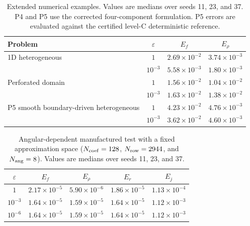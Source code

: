 \begin{table}[t]
\centering
\caption{Extended numerical examples. Values are medians over seeds 11, 23, and 37. P4 and P5 use the corrected four-component formulation. P5 errors are evaluated against the certified level-C deterministic reference.}
\label{tab:extended}
\begin{tabular}{lccc}
\toprule
Problem & $\varepsilon$ & $E_f$ & $E_\rho$\\
\midrule
1D heterogeneous & $1$ & $2.69\times10^{-2}$ & $3.74\times10^{-3}$\\
 & $10^{-3}$ & $5.58\times10^{-3}$ & $1.80\times10^{-3}$\\
\midrule
Perforated domain & $1$ & $1.56\times10^{-2}$ & $1.04\times10^{-2}$\\
 & $10^{-3}$ & $1.63\times10^{-2}$ & $1.38\times10^{-2}$\\
\midrule
P5 smooth boundary-driven heterogeneous & $1$ & $4.23\times10^{-2}$ & $4.76\times10^{-3}$\\
 & $10^{-3}$ & $3.62\times10^{-2}$ & $4.60\times10^{-3}$\\
\bottomrule
\end{tabular}
\end{table}

\begin{table}[t]
\centering
\caption{Angular-dependent manufactured test with a fixed approximation space ($N_{\rm coef}=128$, $N_{\rm row}=2944$, and $N_{\rm ang}=8$). Values are medians over seeds 11, 23, and 37.}
\label{tab:angular-manufactured}
\begin{tabular}{ccccc}
\toprule
$\varepsilon$ & $E_f$ & $E_\rho$ & $E_r$ & $E_j$\\
\midrule
$1$ & $2.17\times10^{-5}$ & $5.90\times10^{-6}$ & $1.86\times10^{-5}$ & $1.13\times10^{-4}$\\
$10^{-3}$ & $1.64\times10^{-5}$ & $1.59\times10^{-5}$ & $1.64\times10^{-5}$ & $1.12\times10^{-3}$\\
$10^{-6}$ & $1.64\times10^{-5}$ & $1.59\times10^{-5}$ & $1.64\times10^{-5}$ & $1.12\times10^{-3}$\\
\bottomrule
\end{tabular}
\end{table}

